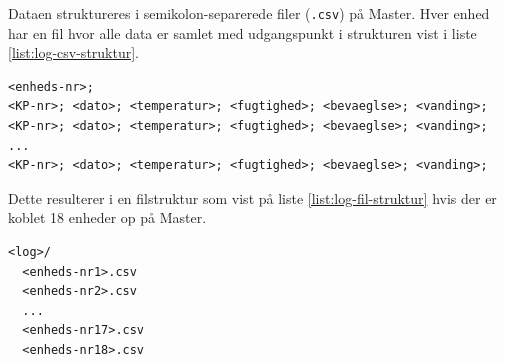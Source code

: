 Dataen struktureres i semikolon-separerede filer (\verb+.csv+) på Master. Hver enhed har en fil hvor alle data er samlet med udgangspunkt i strukturen vist i liste \ref{list:log-csv-struktur}.

\begin{lstlisting}[caption=Semikolon-separeret datafil til log af enheder, label={list:log-csv-struktur}]
<enheds-nr>;
<KP-nr>; <dato>; <temperatur>; <fugtighed>; <bevaeglse>; <vanding>;
<KP-nr>; <dato>; <temperatur>; <fugtighed>; <bevaeglse>; <vanding>;
...
<KP-nr>; <dato>; <temperatur>; <fugtighed>; <bevaeglse>; <vanding>;
\end{lstlisting}

Dette resulterer i en filstruktur som vist på liste \ref{list:log-fil-struktur} hvis der er koblet 18 enheder op på Master.

\begin{lstlisting}[caption=Filstruktur for logfiler på Master, label={list:log-fil-struktur}]
<log>/
  <enheds-nr1>.csv
  <enheds-nr2>.csv
  ...
  <enheds-nr17>.csv
  <enheds-nr18>.csv
\end{lstlisting}
